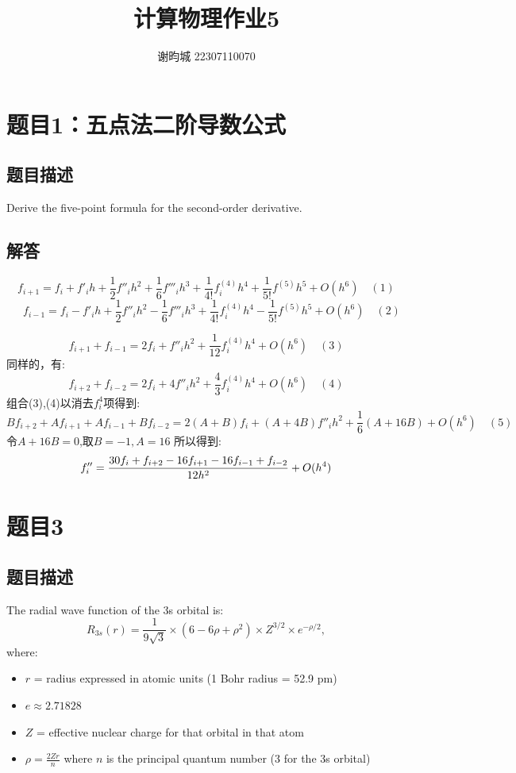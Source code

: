 \documentclass[11pt]{article}
\author{谢昀城 22307110070}
\title{计算物理作业5}
\begin{document}
\maketitle


\section{题目1：五点法二阶导数公式}
\subsection{题目描述}
Derive the five-point formula for the second-order derivative.

\subsection{解答}
\[
f_{i+1} = f_i + f'_i h + \frac{1}{2} f''_i h^2 + \frac{1}{6} f'''_i h^3 + \frac{1}{4!} f^{(4)}_i h^4 + \frac{1}{5!}f^{(5)}h^5+O(h^6) \quad(1)
\]
\[
 \quad f_{i-1} = f_i - f'_i h + \frac{1}{2} f''_i h^2 - \frac{1}{6} f'''_i h^3 + \frac{1}{4!} f^{(4)}_i h^4 -\frac{1}{5!}f^{(5)}h^5+O(h^6) \quad(2)
\]

\[
f_{i+1} + f_{i-1} = 2f_i + f''_i h^2 + \frac{1}{12} f^{(4)}_i h^4 + O(h^6) \quad (3)
\]
同样的，有:
\[
f_{i+2}+f_{i-2}=2f_i+4f''_i h^2 + \frac{4}{3} f^{(4)}_i h^4 + O(h^6) \quad (4)
\]
组合(3),(4)以消去$f^{4}_i$项得到:
\[
Bf_{i+2}+Af_{i+1}+Af_{i-1}+Bf_{i-2}=2(A+B)f_i+(A+4B)f''_i h^2 +\frac{1}{6}(A+16B)+O(h^6) \quad (5)
\]
令$A+16B=0$,取$B=-1,A=16$
所以得到:
\[
f''_i={30f_i+f_{i+2}-16f_{i+1}-16f_{i-1}+f_{i-2}\over 12h^2}+O(h^4)
\]


  \section{题目3}
  \subsection{题目描述}
  The radial wave function of the 3s orbital is:
\[
R_{3s}(r) = \frac{1}{9\sqrt{3}} \times \left(6 - 6\rho + \rho^2\right) \times Z^{3/2} \times e^{-\rho/2},
\]
where:
\begin{itemize}
    \item \( r \) = radius expressed in atomic units (1 Bohr radius = 52.9 pm)
    \item \( e \approx 2.71828 \)
    \item \( Z \) = effective nuclear charge for that orbital in that atom
    \item \( \rho = \frac{2Zr}{n} \) where \( n \) is the principal quantum number (3 for the 3s orbital)
\end{itemize}
\end{document}

